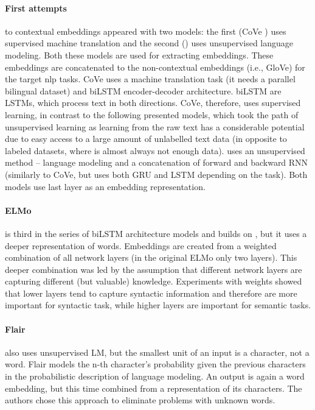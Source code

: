 \paragraph{First attempts} to contextual embeddings appeared with two models: the first (CoVe \citep{McCann2017}) uses supervised machine translation and the second (\citep{Peters2017}) uses unsupervised language modeling. Both these models are used for extracting embeddings. These embeddings are concatenated to the non-contextual embeddings (i.e., GloVe) for the target \acrshort{nlp} tasks. CoVe uses a machine translation task (it needs a parallel bilingual dataset) and biLSTM encoder-decoder architecture.  biLSTM are LSTMs, which  process text in both directions.
CoVe, therefore, uses supervised learning, in contrast to the following presented models, which took the path of unsupervised learning as learning from the raw text has a considerable potential due to easy access to a large amount of unlabelled text data (in opposite to labeled datasets, where is almost always not enough data).
\citep{Peters2017} uses an unsupervised method -- language modeling and a concatenation of forward and backward RNN (similarly to CoVe, but uses both GRU and LSTM depending on the task). Both models use last layer as an embedding representation. 
\paragraph{ELMo} is third in the series of biLSTM architecture models and builds on \citep{Peters2017}, but it uses a deeper representation of words. Embeddings are created from a weighted combination of all network layers (in the original ELMo only two layers). This deeper combination was led by the assumption that different network layers are capturing different (but valuable) knowledge. Experiments with weights showed that lower layers tend to capture syntactic information and therefore are more important for syntactic task, while higher layers are important for semantic tasks. 
\paragraph{Flair} also uses unsupervised LM, but the smallest unit of an input is a character, not a word. Flair models the n-th character's probability given the previous characters in the probabilistic description of language modeling. An output is again a word embedding, but this time combined from a representation of its characters. The authors chose this approach to eliminate problems with unknown words.
